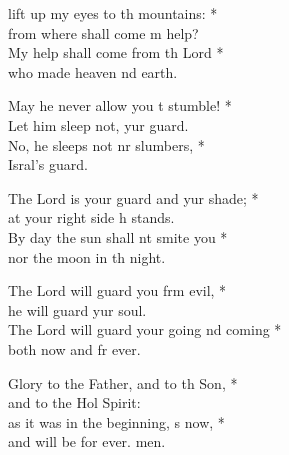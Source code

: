 \settowidth{\versewidth}{The Lord will guard your going and coming * *}
\begin{psalmverse}%
  \begin{patverse}
 lift up my eyes to th mountains: *\Med\\
from where shall come m help?\\
My help shall come from th Lord *\Med\\
who made heaven nd earth.

May he never allow you t stumble! *\Med\\
Let him sleep not, yur guard.\\
No, he sleeps not nr slumbers, *\Med\\
Isral’s guard.

The Lord is your guard and yur shade; *\Med\\
at your right side h stands.\\
By day the sun shall nt smite you *\Med\\
nor the moon in th night.

The Lord will guard you frm evil, *\Med\\
he will guard yur soul.\\
The Lord will guard your going nd coming *\Med\\
both now and fr ever.

Glory to the Father, and to th Son, *\Med\\
and to the Hol Spirit:\\
as it was in the beginning, \pointup{\i}s now, *\Med\\
and will be for ever. men.
  \end{patverse}
\end{psalmverse}
